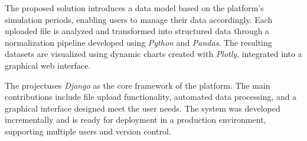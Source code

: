 The proposed solution introduces a data model based on the platform's simulation periods, enabling users to manage their data accordingly. Each uploaded file is analyzed and transformed into structured data through a normalization pipeline developed using \textit{Python} and \textit{Pandas}. The resulting datasets are visualized using dynamic charts created with \textit{Plotly}, integrated into a graphical web interface.

The projectuses \textit{Django} as the core framework of the platform. The main contributions include file upload functionality, automated data processing, and a graphical interface designed meet the user needs. The system was developed incrementally and is ready for deployment in a production environment, supporting multiple users and version control.